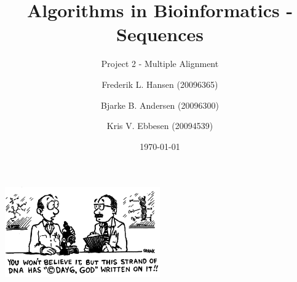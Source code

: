 \documentclass[a4paper, 12pt]{scrartcl}
\title{Algorithms in Bioinformatics - Sequences}
\subtitle{Project 2 - Multiple Alignment}
\date{\today}
\author{Frederik L. Hansen (20096365)
\and
Bjarke B. Andersen (20096300)
\and
Kris V. Ebbesen (20094539)
}
\begin{document}
\maketitle
\begin{center}
	\includegraphics[width=0.5\textwidth]{day6.png}
\end{center}
\newpage
\tableofcontents
\newpage













 
\end{document}
